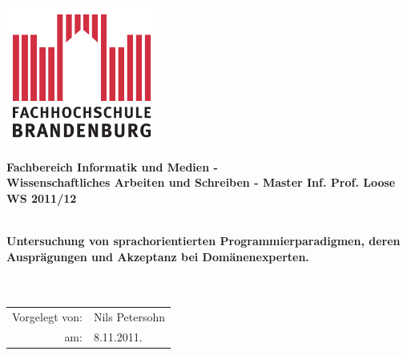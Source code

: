 \titlepage

\begin{center}
\includegraphics[width=5cm]{pics/FH-Logo}\vspace{0.5cm}

\par\end{center}

\noindent \begin{center}
\textsf{\textbf{\Large Fachbereich Informatik und Medien - \\
Wissenschaftliches Arbeiten und Schreiben - Master Inf. Prof. Loose
WS 2011/12}}\\ \textsf{\large }\\
\vspace{1cm}

\par\end{center}

\begin{center}
\textsf{\textbf{\huge Untersuchung von sprachorientierten
Programmierparadigmen, deren Ausprägungen und Akzeptanz bei Domänenexperten.\\
}}\textsf{}\\ \textsf{}\\ 

\par\end{center}{\Large \par}

\vspace{2cm}


\noindent \begin{center}
{\huge }\begin{tabular}{rl}
Vorgelegt von: & Nils Petersohn \tabularnewline am: & 8.11.2011.\tabularnewline
\end{tabular}
\par\end{center}{\huge \par}

\vspace{1cm}




